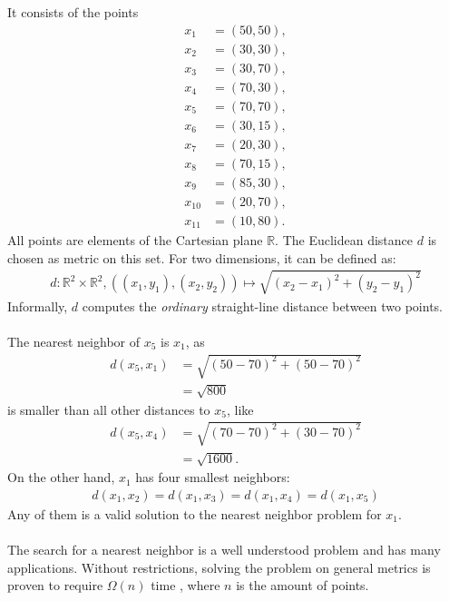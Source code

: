 	It consists of the points
	\begin{align*}
		x_1		&= (50, 50),\\
		x_2		&= (30, 30),\\
		x_3		&= (30, 70),\\
		x_4		&= (70, 30),\\
		x_5		&= (70, 70),\\
		x_6		&= (30, 15),\\
		x_7		&= (20, 30),\\
		x_8		&= (70, 15),\\
		x_9		&= (85, 30),\\
		x_{10}	&= (20, 70),\\
		x_{11}	&= (10, 80).
	\end{align*}
	All points are elements of the Cartesian plane $\mathbb{R}$. The Euclidean distance $d$ is chosen as metric on this set.
	For two dimensions, it can be defined as:
	\begin{align*}
		d: \mathbb{R}^2 \times \mathbb{R}^2, ((x_1, y_1), (x_2, y_2)) \mapsto \sqrt{(x_2 - x_1)^2 + (y_2 - y_1)^2}
	\end{align*}
	Informally, $d$ computes the \textit{ordinary} straight-line distance between two points.\\\\
	The nearest neighbor of $x_5$ is $x_1$, as
	\begin{align*}
		d(x_5, x_1)	&= \sqrt{(50 - 70)^2 + (50 - 70)^2}\\
				&= \sqrt{800}
	\end{align*}
	is smaller than all other distances to $x_5$, like
	\begin{align*}
		d(x_5, x_4)	&= \sqrt{(70 - 70)^2 + (30 - 70)^2}\\
				&= \sqrt{1600}.
	\end{align*}
	On the other hand, $x_1$ has four smallest neighbors:
	\begin{align*}
		d(x_1, x_2) = d(x_1, x_3) = d(x_1, x_4) = d(x_1, x_5)
	\end{align*}
	Any of them is a valid solution to the nearest neighbor problem for $x_1$.\\\\
	The search for a nearest neighbor is a well understood problem  and has many
	applications. Without restrictions, solving the problem on general metrics is proven to
	require $\Omega(n)$ time , where $n$ is the amount of points.
	
